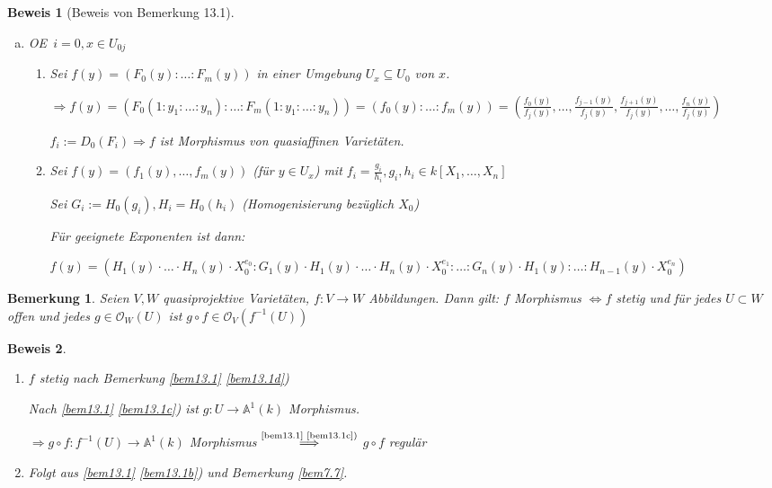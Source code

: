 \documentclass[a4paper, 12pt, numbers=noendperiod, chapterprefix=true]{scrbook}
\theoremstyle{break}
\newtheorem{Bem}[Def]{Bemerkung}
\theoremstyle{nonumberbreak}
\newtheorem{Bew}{Beweis}
\theoremstyle{nonumberplain}
\newcommand{\quot}[1]{\textrm{\glqq}{#1}\textrm{\grqq}}
\newenvironment{twosidedproof}{\begin{enumerate}[\quot{$\Rightarrow$}:]}{\end{enumerate}}
\newcommand{\proofforward}{\item[\quot{$\Rightarrow$}:]}
\newcommand{\proofreverse}{\item[\quot{$\Leftarrow$}:]}
\newcommand{\A}{\mathbb{A}}
\newcommand{\calO}{\mathcal{O}}
\renewcommand{\OE}{O\!\!E~}
\begin{document}
\begin{Bew}[Beweis von Bemerkung 13.1]\begin{enumerate}[a)]
\item[b)]
	\OE $i=0,x\in U_{0j}$\begin{twosidedproof}
	\proofforward
		Sei $f(y)=(F_0(y):\ldots :F_m(y))$ in einer Umgebung $U_x\subseteq U_0$ von $x$.
		
		$\Rightarrow f(y)=(F_0(1:y_1:\ldots :y_n):\ldots :F_m(1:y_1:\ldots :y_n))=(f_0(y):\ldots :f_m(y))=(\frac{f_0(y)}{f_j(y)},\ldots ,\frac{f_{j-1}(y)}{f_j(y)}, \frac{f_{j+1}(y)}{f_j(y)},\ldots ,\frac{f_n(y)}{f_j(y)})$
		
		$f_i:=D_0(F_i)\Rightarrow f$ ist Morphismus von quasiaffinen Variet\"aten.

	\proofreverse
	Sei $f(y)=(f_1(y),\ldots ,f_m(y))$ (f\"ur $y\in U_x$) mit $f_i=\frac{g_i}{h_i}, g_i,h_i\in k[X_1,\ldots ,X_n]$
	
	Sei $G_i:=H_0(g_i), H_i=H_0(h_i)$ (Homogenisierung bez\"uglich $X_0$)
	
	F\"ur geeignete Exponenten ist dann:
	
		$f(y)=(H_1(y)\cdot\ldots \cdot H_n(y)\cdot X_0^{e_0}:G_1(y)\cdot H_1(y)\cdot\ldots \cdot H_n(y)\cdot X_0^{e_1}:\ldots :G_n(y)\cdot H_1(y):\ldots :H_{n-1}(y)\cdot X_0^{e_n})$
\end{twosidedproof}
\end{enumerate}\end{Bew}

\begin{Bem}
Seien $V,W$ quasiprojektive Variet\"aten, $f:V\to W$ Abbildungen. Dann gilt: $f$ Morphismus $\Leftrightarrow f$ stetig und f\"ur jedes $U\subset W$ offen und jedes $g\in \calO_W(U)$ ist $g\circ f \in \calO_V(f^{-1}(U))$
\end{Bem}

\begin{Bew}\begin{twosidedproof}
\proofforward
	$f$ stetig nach Bemerkung \ref{bem13.1} \ref{bem13.1d})
	
	Nach \ref{bem13.1} \ref{bem13.1c}) ist $g:U\to \A^1(k)$ Morphismus.
	
	$\Rightarrow g\circ f: f^{-1}(U)\to\A^1(k)$ Morphismus $\overset{\text{\ref{bem13.1} \ref{bem13.1c})}}{\Longrightarrow}$ $g\circ f$ regul\"ar
\proofreverse
	Folgt aus \ref{bem13.1} \ref{bem13.1b}) und Bemerkung \ref{bem7.7}.
\end{twosidedproof}\end{Bew}
\end{document}
